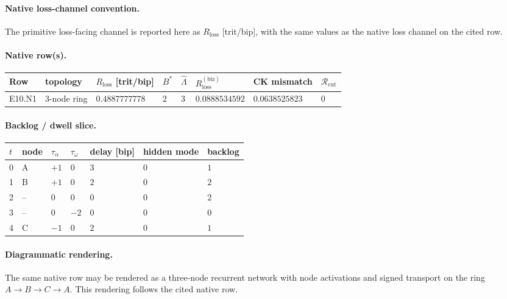 \paragraph{Native loss-channel convention.} The primitive loss-facing channel is reported here as $R_{\mathrm{loss}}$ [trit/bip], with the same values as the native loss channel on the cited row.
\paragraph{Native row(s).}
{\footnotesize
\begin{center}
\begin{tabular}{@{}llllllll@{}}
\toprule
Row & topology & $R_{\mathrm{loss}}$ [trit/bip] & $B^*$ & $\widehat\Lambda$ & $R_{\mathrm{loss}}^{(\mathrm{biz})}$ & CK mismatch & $\mathcal R_{\mathrm{cut}}$ \\
\midrule
E10.N1 & 3-node ring & $0.4887777778$ & $2$ & $3$ & $0.0888534592$ & $0.0638525823$ & $0$ \\
\bottomrule
\end{tabular}
\end{center}}
\paragraph{Backlog / dwell slice.}
{\footnotesize
\begin{center}
\begin{tabular}{@{}lllllll@{}}
\toprule
$t$ & node & $\tau_\alpha$ & $\tau_\omega$ & delay [bip] & hidden mode & backlog \\
\midrule
0 & A & $+1$ & $0$ & $3$ & $0$ & $1$ \\
1 & B & $+1$ & $0$ & $2$ & $0$ & $2$ \\
2 & -- & $0$ & $0$ & $0$ & $0$ & $2$ \\
3 & -- & $0$ & $-2$ & $0$ & $0$ & $0$ \\
4 & C & $-1$ & $0$ & $2$ & $0$ & $1$ \\
\bottomrule
\end{tabular}
\end{center}}
\paragraph{Diagrammatic rendering.} The same native row may be rendered as a three-node recurrent network with node activations and signed transport on the ring $A\to B\to C\to A$. This rendering follows the cited native row.
\begin{center}
\end{center}
